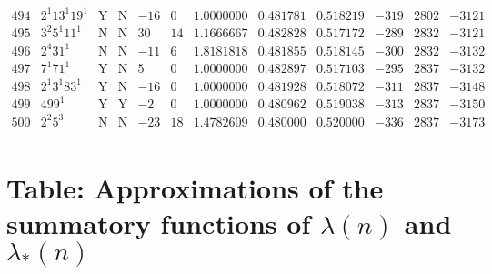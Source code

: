 \documentclass[11pt,reqno,a4letter]{article}
\numberwithin{figure}{section}
\numberwithin{table}{section}
\theoremstyle{plain}
\numberwithin{theorem}{section}
\theoremstyle{definition}
\begin{document}
\begin{table}[ht]
\begin{equation*}
{\begin{array}{cc|cc|ccc|cc|ccc}
 494 & 2^1 13^1 19^1 & \text{Y} & \text{N} & -16 & 0 & 1.0000000 & 0.481781 & 0.518219 & -319 & 2802 & -3121 \\
 495 & 3^2 5^1 11^1 & \text{N} & \text{N} & 30 & 14 & 1.1666667 & 0.482828 & 0.517172 & -289 & 2832 & -3121 \\
 496 & 2^4 31^1 & \text{N} & \text{N} & -11 & 6 & 1.8181818 & 0.481855 & 0.518145 & -300 & 2832 & -3132 \\
 497 & 7^1 71^1 & \text{Y} & \text{N} & 5 & 0 & 1.0000000 & 0.482897 & 0.517103 & -295 & 2837 & -3132 \\
 498 & 2^1 3^1 83^1 & \text{Y} & \text{N} & -16 & 0 & 1.0000000 & 0.481928 & 0.518072 & -311 & 2837 & -3148 \\
 499 & 499^1 & \text{Y} & \text{Y} & -2 & 0 & 1.0000000 & 0.480962 & 0.519038 & -313 & 2837 & -3150 \\
 500 & 2^2 5^3 & \text{N} & \text{N} & -23 & 18 & 1.4782609 & 0.480000 & 0.520000 & -336 & 2837 & -3173 \\  
\end{array}
}
\end{equation*}

\end{table} 

\clearpage 

\newpage
\section{Table: Approximations of the summatory functions of $\lambda(n)$ and $\lambda_{\ast}(n)$} 
\label{table_LAstxSummatoryFuncCompsWithExact_v2} 
\end{document}
